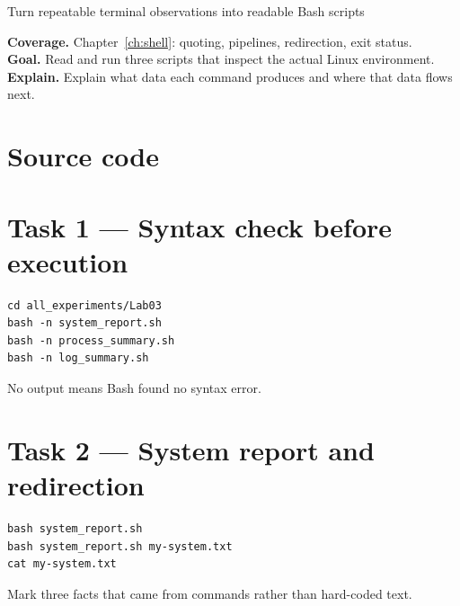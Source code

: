 \begin{labproject}{Turn repeatable terminal observations into readable Bash scripts}

\textbf{Coverage.} Chapter~\ref{ch:shell}: quoting, pipelines, redirection, exit status.\\
\textbf{Goal.} Read and run three scripts that inspect the actual Linux environment.\\
\textbf{Explain.} Explain what data each command produces and where that data flows next.

\section*{Source code}






\section*{Task 1 --- Syntax check before execution}
\begin{lstlisting}[style=utpbash]
cd all_experiments/Lab03
bash -n system_report.sh
bash -n process_summary.sh
bash -n log_summary.sh
\end{lstlisting}
No output means Bash found no syntax error.

\section*{Task 2 --- System report and redirection}
\begin{lstlisting}[style=utpbash]
bash system_report.sh
bash system_report.sh my-system.txt
cat my-system.txt
\end{lstlisting}
Mark three facts that came from commands rather than hard-coded text.


\end{labproject}
